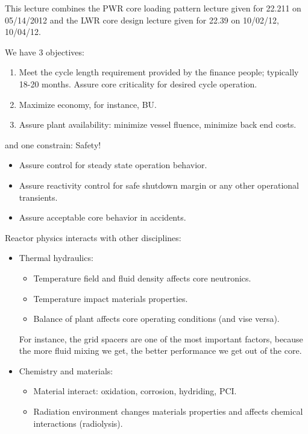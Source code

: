 \documentclass{school-22.211-notes}
\date{May 14, 2012}
\begin{document}
\maketitle

This lecture combines the PWR core loading pattern lecture given for 22.211 on 05/14/2012 and the LWR core design lecture given for 22.39 on 10/02/12, 10/04/12. 

We have 3 objectives:
\begin{enumerate}
\item Meet the cycle length requirement provided by the finance people; typically 18-20 months. Assure core criticality for desired cycle operation. 
\item Maximize economy, for instance, BU. 
\item Assure plant availability: minimize vessel fluence, minimize back end costs. 
\end{enumerate}
and one constrain: Safety!
  \begin{itemize}
    \item Assure control for steady state operation behavior. 
    \item Assure reactivity control for safe shutdown margin or any other operational transients. 
    \item Assure acceptable core behavior in accidents. 
  \end{itemize}
Reactor physics interacts with other disciplines: 
\begin{itemize}
\item Thermal hydraulics: 
  \begin{itemize}
  \item Temperature field and fluid density affects core neutronics. 
  \item Temperature impact materials properties. 
  \item Balance of plant affects core operating conditions (and vise versa). 
  \end{itemize}
  For instance, the grid spacers are one of the most important factors, because the more fluid mixing we get, the better performance we get out of the core. 

\item Chemistry and materials: 
  \begin{itemize}
    \item Material interact: oxidation, corrosion, hydriding, PCI.
    \item Radiation environment changes materials properties and affects chemical interactions (radiolysis). 
  \end{itemize}
\end{itemize}
\end{document}
